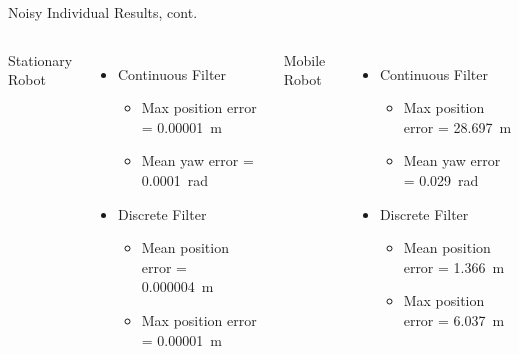 \documentclass[14pt]{beamer}
\begin{document}
\begin{frame}{Noisy Individual Results, cont.}
\begin{columns}[t]
Stationary Robot
    \begin{itemize}
    \item Continuous Filter
        \begin{itemize}
        \item Max position error = \SI{.00001}{\meter}
        \item Mean yaw error = \SI{.0001}{\radian}
        \end{itemize}
    \item Discrete Filter
        \begin{itemize}
        \item Mean position error = \SI{.000004}{\meter}
        \item Max position error = \SI{.00001}{\meter}
        \end{itemize}
    \end{itemize}
Mobile Robot
    \begin{itemize}
    \item Continuous Filter
        \begin{itemize}
        \item Max position error = \SI{28.697}{\meter}
        \item Mean yaw error = \SI{.029}{\radian}
        \end{itemize}
    \item Discrete Filter
        \begin{itemize}
        \item Mean position error = \SI{1.366}{\meter}
        \item Max position error = \SI{6.037}{\meter}
        \end{itemize}
    \end{itemize}
\end{columns}
\end{frame}
\end{document}
